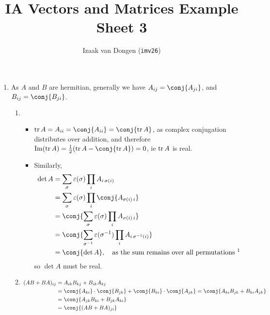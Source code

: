 \documentclass[fleqn,a4paper,11pt]{article}
\title{IA Vectors and Matrices Example Sheet 3}
\author{Izaak van Dongen (\texttt{imv26})}
\begin{document}
 \maketitle\thispagestyle{empty} %

 \begin{enumerate}[label=\textbf{\arabic*.}]
  \item
   As \(A\) and \(B\) are hermitian, generally we have
   \(A_{ij} = \conj{A_{ji}}\), and
   \(B_{ij} = \conj{B_{ji}}\).
   \begin{enumerate}[label=(\roman*)]
    \item
     \begin{itemize}
      \item
       \(\tr A = A_{ii} = \conj{A_{ii}} = \conj{\tr A}\), as
       complex conjugation distributes over addition, and therefore
       \(\Im(\tr A) = \tfrac 12 (\tr A - \conj{\tr A}) = 0\), ie
       \(\operatorname{tr} A\) is real.
      \item
       Similarly,
       \begin{align*}
        \det A
         &= \sum_\sigma \epsilon(\sigma) \prod_i A_{i\,\sigma(i)} \\
         &= \sum_\sigma \epsilon(\sigma) \prod_i \conj{A_{\sigma(i)\,i}} \\
         &= \conj{\sum_\sigma \epsilon(\sigma) \prod_i A_{\sigma(i)\,i}} \\
         &= \conj{\sum_{\sigma^{-1}} \epsilon(\sigma^{-1})
                 \prod_i A_{i\,\sigma^{-1}(i)}} \\
         &= \conj{\det A},\quad
         \text{as the sum remains over all permutations \footnotemark}
       \end{align*}
       so \(\det A\) must be real.
     \end{itemize}
    \item \(
     \begin{aligned}[t]
     (AB + BA)_{ij}
       &= A_{ik}B_{kj} + B_{ik}A_{kj} \\
       &= \conj{A_{ki}} \cdot \conj{B_{jk}} + \conj{B_{ki}} \cdot \conj{A_{jk}}
       = \conj{A_{ki}B_{jk} + B_{ki}A_{jk}} \\
       &= \conj{A_{jk}B_{ki} + B_{jk}A_{ki}} \\
       &= \conj{(AB + BA)_{ji}}
     \end{aligned}\)


\end{enumerate}
\end{enumerate}
\end{document}

